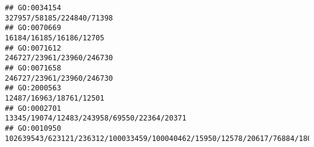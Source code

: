 \documentclass[
]{article}
\begin{document}
\begin{verbatim}
## GO:0034154                                                                                                                                                                                                                                                                                                                                                                                    327957/58185/224840/71398
## GO:0070669                                                                                                                                                                                                                                                                                                                                                                                      16184/16185/16186/12705
## GO:0071612                                                                                                                                                                                                                                                                                                                                                                                    246727/23961/23960/246730
## GO:0071658                                                                                                                                                                                                                                                                                                                                                                                    246727/23961/23960/246730
## GO:2000563                                                                                                                                                                                                                                                                                                                                                                                      12487/16963/18761/12501
## GO:0002701                                                                                                                                                                                                                                                                                                                                                                   13345/19074/12483/243958/69550/22364/20371
## GO:0010950                                                                                                                                                                                                                                                                                                                  102639543/623121/236312/100033459/100040462/15950/12578/20617/76884/18053/18095/54483/19876

\end{verbatim}
\end{document}
